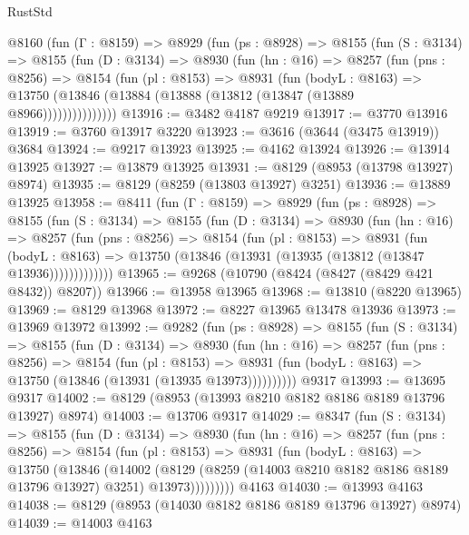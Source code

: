 \begin{lexlean}{RustStd}
\begin{coremodule}
    @8160
      (fun (Γ : @8159) =>
      @8929
        (fun (ps : @8928) =>
        @8155
          (fun (S : @3134) =>
          @8155
            (fun (D : @3134) =>
            @8930
              (fun (hn : @16) =>
              @8257
                (fun (pns : @8256) =>
                @8154
                  (fun (pl : @8153) =>
                  @8931
                    (fun (bodyL : @8163) =>
                    @13750 (@13846 (@13884 (@13888 (@13812 (@13847 (@13889 @8966)))))))))))))))
@13916 := @3482 @4187 @9219
@13917 := @3770 @13916
@13919 := @3760 @13917 @3220
@13923 := @3616 (@3644 (@3475 @13919)) @3684
@13924 := @9217 @13923
@13925 := @4162 @13924
@13926 := @13914 @13925
@13927 := @13879 @13925
@13931 := @8129 (@8953 (@13798 @13927) @8974)
@13935 := @8129 (@8259 (@13803 @13927) @3251)
@13936 := @13889 @13925
@13958 := @8411
    (fun (Γ : @8159) =>
    @8929
      (fun (ps : @8928) =>
      @8155
        (fun (S : @3134) =>
        @8155
          (fun (D : @3134) =>
          @8930
            (fun (hn : @16) =>
            @8257
              (fun (pns : @8256) =>
              @8154
                (fun (pl : @8153) =>
                @8931
                  (fun (bodyL : @8163) =>
                  @13750 (@13846 (@13931 (@13935 (@13812 (@13847 @13936)))))))))))))
@13965 := @9268 (@10790 (@8424 (@8427 (@8429 @421 @8432)) @8207))
@13966 := @13958 @13965
@13968 := @13810 (@8220 @13965)
@13969 := @8129 @13968
@13972 := @8227 @13965 @13478 @13936
@13973 := @13969 @13972
@13992 := @9282
    (fun (ps : @8928) =>
    @8155
      (fun (S : @3134) =>
      @8155
        (fun (D : @3134) =>
        @8930
          (fun (hn : @16) =>
          @8257
            (fun (pns : @8256) =>
            @8154
              (fun (pl : @8153) =>
              @8931 (fun (bodyL : @8163) => @13750 (@13846 (@13931 (@13935 @13973))))))))))
    @9317
@13993 := @13695 @9317
@14002 := @8129 (@8953 (@13993 @8210 @8182 @8186 @8189 @13796 @13927) @8974)
@14003 := @13706 @9317
@14029 := @8347
    (fun (S : @3134) =>
    @8155
      (fun (D : @3134) =>
      @8930
        (fun (hn : @16) =>
        @8257
          (fun (pns : @8256) =>
          @8154
            (fun (pl : @8153) =>
            @8931
              (fun (bodyL : @8163) =>
              @13750
                (@13846
                  (@14002
                    (@8129
                      (@8259 (@14003 @8210 @8182 @8186 @8189 @13796 @13927) @3251)
                      @13973)))))))))
    @4163
@14030 := @13993 @4163
@14038 := @8129 (@8953 (@14030 @8182 @8186 @8189 @13796 @13927) @8974)
@14039 := @14003 @4163

\end{coremodule}
\end{lexlean}
